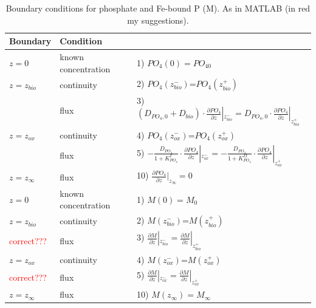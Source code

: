 \documentclass[gmd, manuscript]{copernicus}
\begin{document}
\begin{table}[tbp]
\caption{Boundary conditions for phosphate and Fe-bound P (M). As in MATLAB (in red my suggestions).}
\centering
\begin{tabular}{ |l| l| l|}
\hline
\textbf{Boundary}& \textbf{Condition}&\\
\hline
$z=0$& known concentration& 1) $PO_4(0)=PO_{40}$  \\
$z=z_{bio}$&continuity& 2) $PO_4(z_{bio}^-)$=$PO_4(z_{bio}^+)$\\
               & flux & 3) $\left(D_{PO_4,0}+D_{bio}\right )\cdot \frac{\partial PO_4}{\partial z}|_{z_{bio}^-}=D_{PO_4,0} \cdot \frac{\partial PO_4}{\partial z}|_{z_{bio}^+}$\\
$z=z_{ox}$& continuity& 4) $PO_4(z_{ox}^-)$=$PO_4(z_{ox}^+)$\\
               & flux & 5) $-\frac{D_{PO_4}}{1+K_{PO_4}^I} \cdot \frac{\partial PO_4}{\partial z}|_{z_{ox}^-} =-\frac{D_{PO_4}}{1+K_{PO_4}^{II}} \cdot \frac{\partial PO_4}{\partial z}|_{z_{ox}^+}$\\
$z=z_{\infty}$& flux & 10) $\frac{\partial PO_4}{\partial z}|_{z_\infty}=0$\\
\hline
$z=0$& known concentration& 1) $M(0)=M_0$  \\
$z=z_{bio}$&continuity& 2) $M(z_{bio}^-)$=$M(z_{bio}^+)$\\
 \textcolor{red}{correct???} & flux & 3) $\frac{\partial M}{\partial z}|_{z_{bio}^-}=\frac{\partial M}{\partial z}|_{z_{bio}^+}$\\
$z=z_{ox}$& continuity& 4) $M(z_{ox}^-)$=$M(z_{ox}^+)$\\
 \textcolor{red}{correct???} & flux & 5) $\frac{\partial M}{\partial z}|_{z_{ox}^-} =\frac{\partial M}{\partial z}|_{z_{ox}^+}$\\
$z=z_{\infty}$& flux & 10) $M(z_\infty)=M_\infty$\\
\hline    
\end{tabular}
\label{Tab:BC_PO4+M}
\end{table}
\end{document}
